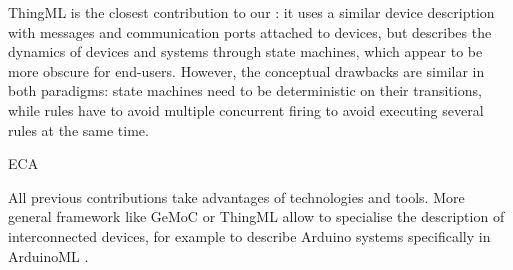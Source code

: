 ThingML \cite{Harrand-Fleurey-Morin-Husa:2016} is the closest contribution to our \DSL: it uses a similar device description with messages and communication ports attached to devices, but describes the dynamics of devices and systems through state machines, which appear to be more obscure for end-users. However, the conceptual drawbacks are similar in both paradigms: state machines need to be deterministic on their transitions, while rules have to avoid multiple concurrent firing to avoid executing several rules at the same time. 

ECA~\cite{cheng-16}

All previous contributions take advantages of \MDE technologies and tools. More general \MDE framework like GeMoC \cite{Bousse-Degueule-Vojtisek-etAl:2016} or ThingML allow to specialise the description of interconnected devices, for example to describe Arduino systems specifically in ArduinoML \cite{Mosser-Collet-BlayFornarino:2014}.